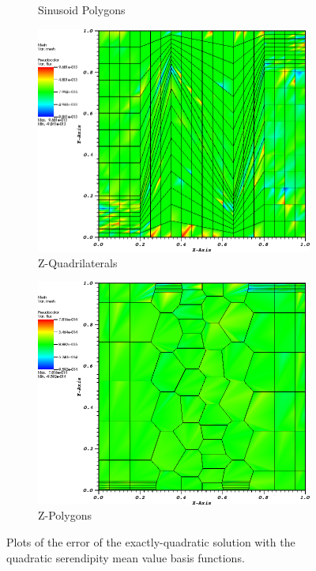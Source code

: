 \begin{figure}
{\begin{subfigure}[b]{0.465\textwidth}
		\caption{Sinusoid Polygons}
	\end{subfigure}
}
\vspace{3mm}
{
	\begin{subfigure}[b]{0.465\textwidth}
		\centering
		\label{subfig::z_quad_me_k2_lin_sol}
		\includegraphics[width=\textwidth]{figures/sec_BF/quad_err_zquad_MV2.png}
		\caption{Z-Quadrilaterals}
	\end{subfigure}
	\hfill
	\begin{subfigure}[b]{0.465\textwidth}
		\centering
		\label{subfig::z_poly_me_k2_lin_sol}
		\includegraphics[width=\textwidth]{figures/sec_BF/quad_err_zpoly_MV2.png}
		\caption{Z-Polygons}
	\end{subfigure}
}
\caption{Plots of the error of the exactly-quadratic solution with the quadratic serendipity mean value basis functions.}
\label{fig::BF_Results_quad_err_MV2}
\end{figure}

